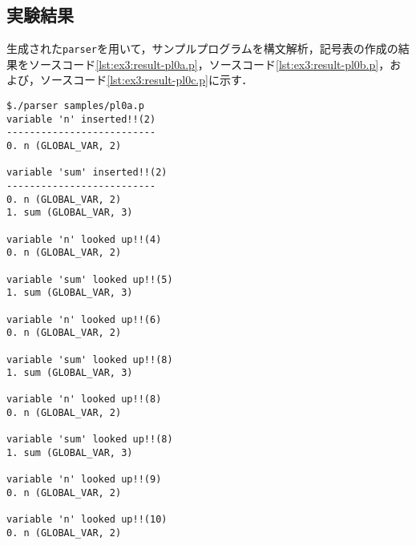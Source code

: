 \documentclass[uplatex]{jsarticle}
\begin{document}
\subsection{実験結果}
生成された\verb#parser#を用いて，サンプルプログラムを構文解析，記号表の作成の結果をソースコード\ref{lst:ex3:result-pl0a.p}，ソースコード\ref{lst:ex3:result-pl0b.p}，および，ソースコード\ref{lst:ex3:result-pl0c.p}に示す．
\begin{lstlisting}[caption=pl0a.pに対するparserの実行,label=lst:ex3:result-pl0a.p]
$./parser samples/pl0a.p
variable 'n' inserted!!(2)
--------------------------
0. n (GLOBAL_VAR, 2)

variable 'sum' inserted!!(2)
--------------------------
0. n (GLOBAL_VAR, 2)
1. sum (GLOBAL_VAR, 3)

variable 'n' looked up!!(4)
0. n (GLOBAL_VAR, 2)

variable 'sum' looked up!!(5)
1. sum (GLOBAL_VAR, 3)

variable 'n' looked up!!(6)
0. n (GLOBAL_VAR, 2)

variable 'sum' looked up!!(8)
1. sum (GLOBAL_VAR, 3)

variable 'n' looked up!!(8)
0. n (GLOBAL_VAR, 2)

variable 'sum' looked up!!(8)
1. sum (GLOBAL_VAR, 3)

variable 'n' looked up!!(9)
0. n (GLOBAL_VAR, 2)

variable 'n' looked up!!(10)
0. n (GLOBAL_VAR, 2)

\end{lstlisting}
\end{document}
